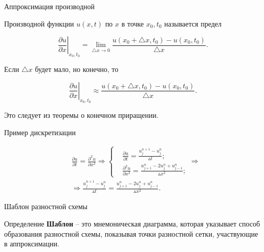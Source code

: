 \documentclass[10pt,xcolor=pst,aspectratio=169]{beamer}
\begin{document}
\begin{frame}{Аппроксимация производной}

	\transdissolve[duration=0.1]
	\justifying
	\large

    Производной функции $u(x,t)$ по $x$ в точке $x_{0}, t_{0}$ называется предел

	\[
        \left. \frac{\partial u}{\partial x} \right|_{x_{0}, t_{0}} = \lim_{\triangle x \rightarrow 0} \frac{u \left( x_{0} + \triangle x, t_{0} \right) - u \left( x_{0}, t_{0} \right)}{\triangle x}.
    \]

    Если $\triangle x$ будет мало, но конечно, то

    \[
        \left. \frac{\partial u}{\partial x} \right|_{x_{0}, t_{0}} \approx \frac{u \left( x_{0} + \triangle x, t_{0} \right) - u \left( x_{0}, t_{0} \right)}{\triangle x}.
    \]

    Это следует из теоремы о конечном приращении.

\end{frame}

\begin{frame}{Пример дискретизации}

	\transdissolve[duration=0.1]
	\justifying
	\large

	\[
		\begin{split}
			&\frac{\partial u}{\partial t} = \frac{\partial^{2} u}{\partial x^{2}} \Rightarrow
			\begin{cases}
				&\frac{\partial u}{\partial t} = \frac{u^{n + 1}_{j} - u^{n}_{j}}{\vartriangle t}; \\
				&\frac{\partial^{2} u}{\partial x^{2}} = \frac{u^{n}_{j + 1} - 2 u^{n}_{j} + u^{n}_{j - 1}}{\vartriangle x^{2}};
			\end{cases} \Rightarrow \\
			&\Rightarrow \frac{u^{n + 1}_{j} - u^{n}_{j}}{\vartriangle t} = \frac{u^{n}_{j + 1} - 2 u^{n}_{j} + u^{n}_{j - 1}}{\vartriangle x^{2}}.
		\end{split}
	\]

\end{frame}

\begin{frame}{Шаблон разностной схемы}

	\transdissolve[duration=0.1]
	\justifying
	\large

	\begin{block}{Определение}
		\justifying
		\textbf{Шаблон} -- это мнемоническая диаграмма, которая указывает способ образования разностной схемы, показывая точки разностной сетки, участвующие в аппроксимации.
	\end{block}
 
\end{frame}
\end{document}
